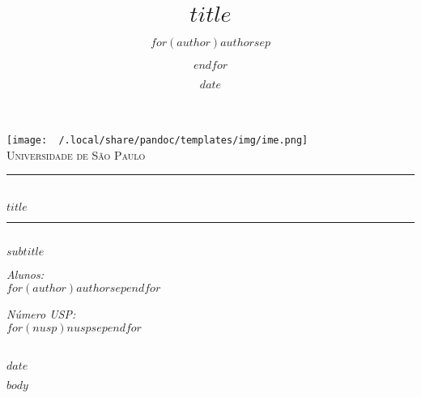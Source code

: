 \documentclass[12pt,paper=a4]{article}
\title{$title$}
\author{$for(author)$$author$$sep$ \and $endfor$}
\date{$date$}
\begin{document}
\begin{titlepage}
  \centering

  \texttt{[image: ~/.local/share/pandoc/templates/img/ime.png]} \\ [1.0 cm]  
  \textsc{\LARGE Universidade de São Paulo} \\ [2.0 cm]  

  \rule{\linewidth}{0.2 mm} \\ [0.5 cm]
  { \huge \bfseries $title$ } \\
  \rule{\linewidth}{0.2 mm} \\ [0.5 cm]

  \textsc{\large $subtitle$} \\ [4 cm]

  \begin{minipage}{0.4\textwidth} %
    \begin{flushleft} \large
      \emph{Alunos:}\\
      $for(author)$$author$$sep$\newline $endfor$ \\
    \end{flushleft}
  \end{minipage}
  \begin{minipage}{0.4\textwidth} %
    \begin{flushright} \large
      \emph{Número USP:} \\
      $for(nusp)$$nusp$$sep$\newline $endfor$ \\
    \end{flushright}
  \end{minipage}\\[2 cm]

  \vfill
  {\large $date$}

\end{titlepage}


\tableofcontents
\pagebreak

\listoffigures
\pagebreak

\listoftables
\pagebreak

\justify %
$body$

\printbibliography[heading = bibintoc]
\end{document}
